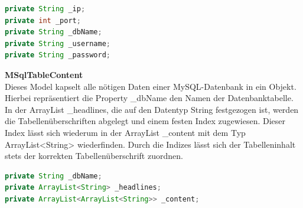 \begin{lstlisting}[caption=Parameter für eine MySQL-Datenbankverbindung, language=Java]
private String _ip;
private int _port;
private String _dbName;
private String _username;
private String _password;
\end{lstlisting}
\textbf{MSqlTableContent}\\
Dieses Model kapselt alle nötigen Daten einer MySQL-Datenbank in ein Objekt. Hierbei repräsentiert die Property {\_}dbName den Namen der Datenbanktabelle. In der ArrayList {\_}headlines, die auf den Datentyp {\frqq}String{\flqq} festgezogen ist, werden die Tabellenüberschriften abgelegt und einem festen Index zugewiesen. Dieser Index lässt sich wiederum in der ArrayList {\_}content mit dem Typ ArrayList<String> wiederfinden. Durch die Indizes lässt sich der Tabelleninhalt stets der korrekten Tabellenüberschrift zuordnen.

\begin{lstlisting}[caption=Repräsentation einer MySQL-Tabelle als Java-Objekt, language=Java]
private String _dbName;
private ArrayList<String> _headlines;
private ArrayList<ArrayList<String>> _content;
\end{lstlisting}

